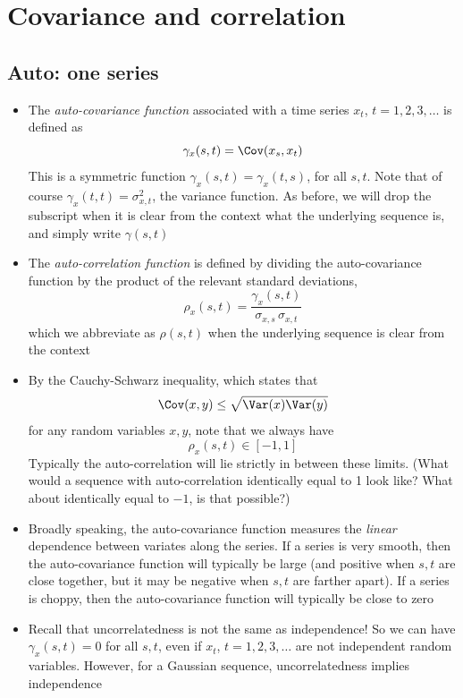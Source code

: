 \documentclass{article}
\begin{document}
\section{Covariance and correlation}

\subsection{Auto: one series}

\begin{itemize}
\item The \emph{auto-covariance function} associated with a time series $x_t$,
  $t = 1,2,3,\dots$ is defined as
  \[
  \gamma_x(s,t) = \Cov(x_s, x_t)
  \]
  This is a symmetric function $\gamma_x(s,t) = \gamma_x(t,s)$, for all $s,t$.
  Note that of course $\gamma_x(t,t) = \sigma^2_{x,t}$, the variance
  function. As before, we will drop the subscript when it is clear from the
  context what the underlying sequence is, and simply write $\gamma(s,t)$  

\item The \emph{auto-correlation function} is defined by dividing the
  auto-covariance function by the product of the relevant standard deviations, 
  \[
  \rho_x(s,t) = \frac{\gamma_x(s,t)}{\sigma_{x,s} \, \sigma_{x,t}}
  \]
  which we abbreviate as $\rho(s,t)$ when the underlying sequence is clear from
  the context 

\item By the Cauchy-Schwarz inequality, which states that
  \[
  \Cov(x, y) \leq \sqrt{\Var(x) \Var(y)}
  \]
  for any random variables $x,y$, note that we always have
  \[
  \rho_x(s,t) \in [-1, 1]
  \]
  Typically the auto-correlation will lie strictly in between these limits. 
  (What would a sequence with auto-correlation identically equal to 1 look like?  
  What about identically equal to $-1$, is that possible?) 

\item Broadly speaking, the auto-covariance function measures the \emph{linear}
  dependence between variates along the series. If a series is very smooth, then
  the auto-covariance function will typically be large (and positive when $s,t$
  are close together, but it may be negative when $s,t$ are farther apart). If a 
  series is choppy, then the auto-covariance function will typically be close to
  zero 

\item Recall that uncorrelatedness is not the same as independence! So we can
  have $\gamma_x(s,t) = 0$ for all $s,t$, even if $x_t$, $t = 1,2,3,\dots$ are
  not independent random variables. However, for a Gaussian sequence,
  uncorrelatedness implies independence


\end{itemize}
\end{document}
